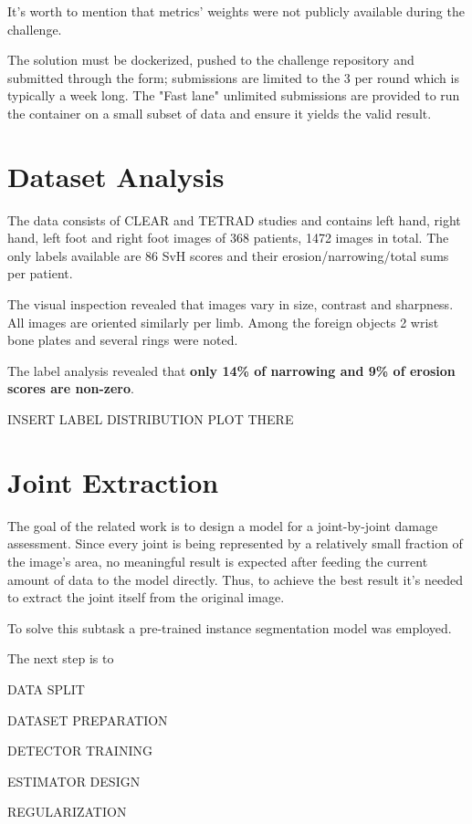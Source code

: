 \documentclass[thesis=B,english]{FITthesis}[2019/12/23]
\begin{document}
It's worth to mention that metrics' weights were not publicly available during the challenge.

The solution must be dockerized, pushed to the challenge repository and submitted through the form; submissions are limited to the 3 per round which is typically a week long. The "Fast lane" unlimited submissions are provided to run the container on a small subset of data and ensure it yields the valid result.

\section{Dataset Analysis}
The data consists of CLEAR and TETRAD studies and contains left hand, right hand, left foot and right foot images of 368 patients, 1472 images in total. The only labels available are 86 SvH scores and their erosion/narrowing/total sums per patient.

The visual inspection revealed that images vary in size, contrast and sharpness. All images are oriented similarly per limb. Among the foreign objects 2 wrist bone plates and several rings were noted.

The label analysis revealed that \textbf{only 14\% of narrowing and 9\% of erosion scores are non-zero}.




INSERT LABEL DISTRIBUTION PLOT THERE




\section{Joint Extraction}

The goal of the related work is to design a model for a joint-by-joint damage assessment. Since every joint is being represented by a relatively small fraction of the image's area, no meaningful result is expected after feeding the current amount of data to the model directly. Thus, to achieve the best result it's needed to extract the joint itself from the original image.

To solve this subtask a pre-trained instance segmentation model was employed.

The next step is to 

DATA SPLIT

DATASET PREPARATION

DETECTOR TRAINING

ESTIMATOR DESIGN

REGULARIZATION
\end{document}

